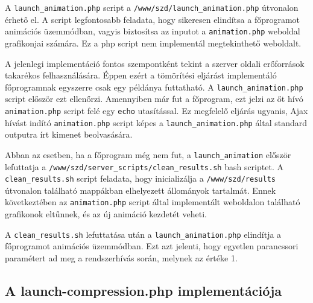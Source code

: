 \documentclass[oneside,titlepage,12pt,a4paper]{report}
\begin{document}
A \texttt{launch\_animation.php} script a \texttt{/www/szd/launch\_animation.php} útvonalon érhető el. A script legfontosabb feladata, hogy sikeresen elindítsa a főprogramot animációs üzemmódban, vagyis biztosítsa az inputot a \texttt{animation.php} weboldal grafikonjai számára. Ez a php script nem implementál megtekinthető weboldalt.
\par A jelenlegi implementáció fontos szempontként tekint a szerver oldali erőforrások takarékos felhasználására. Éppen ezért a tömörítési eljárást implementáló főprogramnak egyszerre csak egy példánya futtatható. A \texttt{launch\_animation.php} script először ezt ellenőrzi. Amennyiben már fut a főprogram, ezt jelzi az őt hívó \texttt{animation.php} script felé egy \texttt{echo} utasítással. Ez megfelelő eljárás ugyanis, Ajax hívást indító \texttt{animation.php} script képes a \texttt{launch\_animation.php} által standard outputra írt kimenet beolvasására. 
\par Abban az esetben, ha a főprogram még nem fut, a \texttt{launch\_animation} először \linebreak lefuttatja a \texttt{/www/szd/server\_scripts/clean\_results.sh} bash scriptet. \linebreak A \texttt{clean\_results.sh} script feladata, hogy inicializálja a \texttt{/www/szd/results} útvonalon található mappákban elhelyezett állományok tartalmát. Ennek következtében az \texttt{animation.php} script által implementált weboldalon található grafikonok eltűnnek, és az új animáció kezdetét veheti.
\par A \texttt{clean\_results.sh} lefuttatása után a \texttt{launch\_animation.php} elindítja a főprogramot animációs üzemmódban. Ezt azt jelenti, hogy egyetlen parancssori paramétert ad meg a rendszerhívás során, melynek az értéke 1.

\subsection{A launch-compression.php implementációja}
\end{document}
